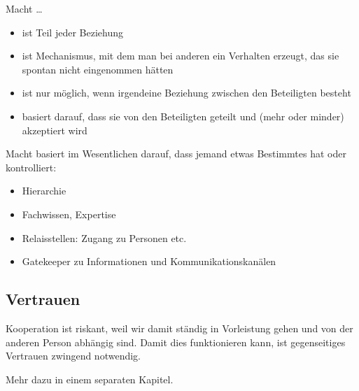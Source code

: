 Macht …

\begin{itemize}
  \item ist Teil jeder Beziehung
  \item ist Mechanismus, mit dem man bei anderen ein Verhalten erzeugt, das sie spontan nicht eingenommen hätten
  \item ist nur möglich, wenn irgendeine Beziehung zwischen den Beteiligten besteht
  \item basiert darauf, dass sie von den Beteiligten geteilt und (mehr oder minder) akzeptiert wird
\end{itemize}

Macht basiert im Wesentlichen darauf, dass jemand etwas Bestimmtes hat oder kontrolliert:

\begin{itemize}
  \item Hierarchie
  \item Fachwissen, Expertise
  \item Relaisstellen: Zugang zu Personen etc.
  \item Gatekeeper zu Informationen und Kommunikationskanälen
\end{itemize}


\subsection{Vertrauen}

Kooperation ist riskant, weil wir damit ständig in Vorleistung gehen und von der anderen Person abhängig sind. Damit dies funktionieren kann, ist gegenseitiges Vertrauen zwingend notwendig.

Mehr dazu in einem separaten Kapitel.
